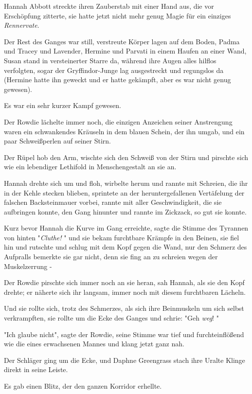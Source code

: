 {Hannah Abbott streckte ihren Zauberstab mit einer Hand aus, die vor Erschöpfung zitterte, sie hatte jetzt nicht mehr genug Magie für ein einziges \emph{Rennervate}.

Der Rest des Ganges war still, verstreute Körper lagen auf dem Boden, Padma und Tracey und Lavender, Hermine und Parvati in einem Haufen an einer Wand, Susan stand in versteinerter Starre da, während ihre Augen alles hilflos verfolgten, sogar der Gryffindor-Junge lag ausgestreckt und regungslos da (Hermine hatte ihn geweckt und er hatte gekämpft, aber es war nicht genug gewesen).

Es war ein sehr kurzer Kampf gewesen.

Der Rowdie lächelte immer noch, die einzigen Anzeichen seiner Anstrengung waren ein schwankendes Kräuseln in dem blauen Schein, der ihn umgab, und ein paar Schweißperlen auf seiner Stirn.

Der Rüpel hob den Arm, wischte sich den Schweiß von der Stirn und pirschte sich wie ein lebendiger Lethifold in Menschengestalt an sie an.

Hannah drehte sich um und floh, wirbelte herum und rannte mit Schreien, die ihr in der Kehle stecken blieben, sprintete an der heruntergefallenen Vertäfelung der falschen Backsteinmauer vorbei, rannte mit aller Geschwindigkeit, die sie aufbringen konnte, den Gang hinunter und rannte im Zickzack, so gut sie konnte.

Kurz bevor Hannah die Kurve im Gang erreichte, sagte die Stimme des Tyrannen von hinten "\emph{Cluthe!} " und sie bekam furchtbare Krämpfe in den Beinen, sie fiel hin und rutschte und schlug mit dem Kopf gegen die Wand, nur den Schmerz des Aufpralls bemerkte sie gar nicht, denn sie fing an zu schreien wegen der Muskelzerrung -

Der Rowdie pirschte sich immer noch an sie heran, sah Hannah, als sie den Kopf drehte; er näherte sich ihr langsam, immer noch mit diesem furchtbaren Lächeln.

Und sie rollte sich, trotz des Schmerzes, als sich ihre Beinmuskeln um sich selbst verkrampften, sie rollte um die Ecke des Ganges und schrie: "Geh \emph{weg}! "

"Ich glaube nicht", sagte der Rowdie, seine Stimme war tief und furchteinflößend wie die eines erwachsenen Mannes und klang jetzt ganz nah.

Der Schläger ging um die Ecke, und Daphne Greengrass stach ihre Uralte Klinge direkt in seine Leiste.

Es gab einen Blitz, der den ganzen Korridor erhellte.

}

